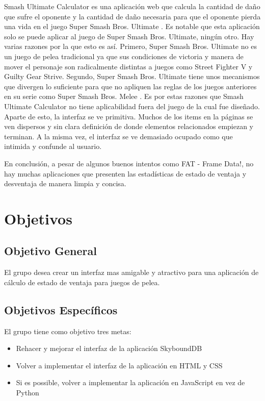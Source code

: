 Smash Ultimate Calculator es una aplicación web que calcula la cantidad de daño que sufre el oponente y la cantidad de daño necesaria para que el oponente pierda una vida en el juego Super Smash Bros. Ultimate \cite{noauthor_super_2022-1}. Es notable que esta aplicación solo se puede aplicar al juego de Super Smash Bros. Ultimate, ningún otro. Hay varias razones por la que esto es así. Primero, Super Smash Bros. Ultimate no es un juego de pelea tradicional ya que sus condiciones de victoria y manera de mover el personaje son radicalmente distintas a juegos como Street Fighter V y Guilty Gear Strive. Segundo, Super Smash Bros. Ultimate tiene unos mecanismos que divergen lo suficiente para que no apliquen las reglas de los juegos anteriores en su serie como Super Smash Bros. Melee \cite{noauthor_super_nodate-1}. Es por estas razones que Smash Ultimate Calculator no tiene aplicabilidad fuera del juego de la cual fue diseñado. Aparte de esto, la interfaz se ve primitiva. Muchos de los items en la páginas se ven dispersos y sin clara definición de donde elementos relacionados empiezan y terminan. A la misma vez, el interfaz se ve demasiado ocupado como que intimida y confunde al usuario.

En conclusión, a pesar de algunos buenos intentos como FAT - Frame Data!, no hay muchas aplicaciones que presenten las estadísticas de estado de ventaja y desventaja de manera limpia y concisa.

\section{Objetivos}

\subsection{Objetivo General} 

El grupo desea crear un interfaz mas amigable y atractivo para una aplicación de cálculo de estado de ventaja para juegos de pelea.

\subsection{Objetivos Específicos}

El grupo tiene como objetivo tres metas:
\begin{itemize}
    \item Rehacer y mejorar el interfaz de la aplicación SkyboundDB \cite{aramis_matos_aramis-matosskybounddb_2021-1}
    \item Volver a implementar el interfaz de la aplicación en HTML y CSS
    \item Si es possible, volver a implementar la aplicación en JavaScript en vez de Python
\end{itemize}

